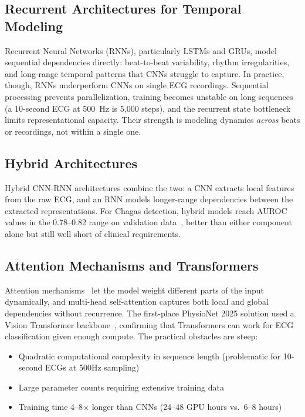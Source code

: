 \subsection{Recurrent Architectures for Temporal Modeling}

Recurrent Neural Networks (RNNs), particularly LSTMs and GRUs, model sequential dependencies directly: beat-to-beat variability, rhythm irregularities, and long-range temporal patterns that CNNs struggle to capture. In practice, though, RNNs underperform CNNs on single ECG recordings. Sequential processing prevents parallelization, training becomes unstable on long sequences (a 10-second ECG at 500~Hz is 5,000 steps), and the recurrent state bottleneck limits representational capacity. Their strength is modeling dynamics \emph{across} beats or recordings, not within a single one.

\subsection{Hybrid Architectures}

Hybrid CNN-RNN architectures combine the two: a CNN extracts local features from the raw ECG, and an RNN models longer-range dependencies between the extracted representations. For Chagas detection, hybrid models reach AUROC values in the 0.78--0.82 range on validation data~\cite{jidling2023screening}, better than either component alone but still well short of clinical requirements.

\subsection{Attention Mechanisms and Transformers}

Attention mechanisms~\cite{vaswani2017attention} let the model weight different parts of the input dynamically, and multi-head self-attention captures both local and global dependencies without recurrence. The first-place PhysioNet 2025 solution used a Vision Transformer backbone~\cite{santvliet2025detecting}, confirming that Transformers can work for ECG classification given enough compute. The practical obstacles are steep:
\begin{itemize}
    \item Quadratic computational complexity in sequence length (problematic for 10-second ECGs at 500Hz sampling)
    \item Large parameter counts requiring extensive training data
    \item Training time 4--8$\times$ longer than CNNs (24--48 GPU hours vs.\ 6--8 hours)
\end{itemize}

